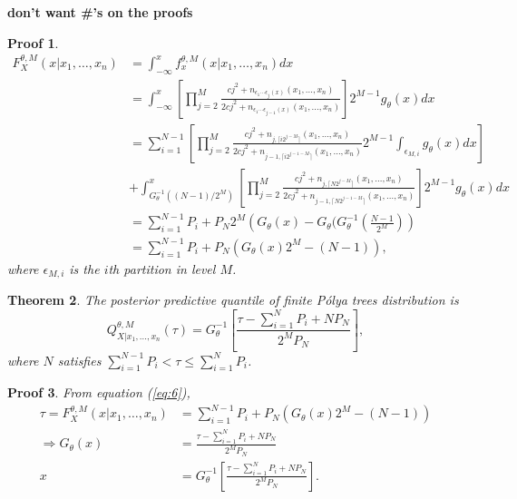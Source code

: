 \documentclass[12pt]{article}
\newtheorem{thm}{Theorem}[subsection]
\newtheorem{prf}[thm]{Proof}
\newcommand{\polya}{P\'{o}lya}
\begin{document}
{\bf don't want \#'s on the proofs}
\begin{prf}
\begin{align*}
F^{\theta,M}_X(x| x_1, \ldots, x_n) & = \int_{-\infty}^x
f_x^{\theta,M} (x|x_1, \ldots, x_n) dx \\
& = \int_{-\infty}^x \left[
  \prod_{j=2}^M \frac{cj^2 + n_{\epsilon_1 \cdots \epsilon_j(x) }(x_1 , \ldots, x_n)}{2cj^2
  + n_{\epsilon_1 \cdots \epsilon_{j-1}(x)}(x_1, \ldots, x_n)}
\right]2^{M-1} g_\theta(x) dx \\
& =  \sum_{i=1}^{N-1} \left[ \prod_{j=2}^M \frac{cj^2 + n_{j, \lceil i2^{j-M}
  \rceil}(x_1,
    \ldots, x_n)}{2cj^2 + n_{j-1, \lceil i2^{j-1-M}
  \rceil}(x_1, \ldots, x_n)} 2^{M-1}
  \int_{\epsilon_{M,i}} g_{\theta}(x) dx \right] \\
&+ 
\int_{G^{-1}_{\theta}((N-1)/2^M)}^x \left[ \prod_{j=2}^M \frac{cj^2 + n_{j, \lceil N2^{j-M}
  \rceil}(x_1,
    \ldots, x_n)}{2cj^2 + n_{j-1, \lceil N2^{j-1-M}
  \rceil}(x_1, \ldots, x_n)}\right] 2^{M-1}
   g_{\theta}(x) dx \\
& = \sum_{i=1}^{N-1} P_i + P_N 2^M \left( G_{\theta}(x) -
  G_{\theta}(G_{\theta}^{-1}\left( \frac{N-1}{2^M} \right)\right)\\
& = \sum_{i=1}^{N-1}P_i + P_N \left( G_{\theta}(x) 2^M - (N-1) \right),
\end{align*}
where $\epsilon_{M,i}$ is the $i$th partition in level $M$. 
\end{prf}

\begin{thm}
The posterior predictive quantile of finite \polya{} trees
distribution is 
\begin{equation}
\label{eq:7}
Q^{\theta, M}_{X|x_1, \ldots, x_n}(\tau) = G^{-1}_{\theta} \left[
  \frac{\tau- \sum_{i=1}^N P_i + N P_N}{2^M P_N} \right],
\end{equation}
where $N$ satisfies $ \sum_{i=1}^{N-1} P_i < \tau \le \sum_{i=1}^N P_i$.
\end{thm}

\begin{prf}
From equation (\ref{eq:6}), 
\begin{align*}
\tau = F^{\theta,M}_X(x|x_1, \ldots, x_n) &= \sum_{i=1}^{N-1} P_{i} + P_N
\left( G_{\theta}(x)2^M -(N-1) \right) \\
\Rightarrow G_{\theta}(x) &= \frac{\tau - \sum_{i=1}^NP_i +
  NP_N}{2^MP_N} \\
x & = G_{\theta}^{-1} \left[\frac{\tau - \sum_{i=1}^NP_i +
  NP_N}{2^MP_N}  \right].
\end{align*}
\end{prf}
\end{document}
